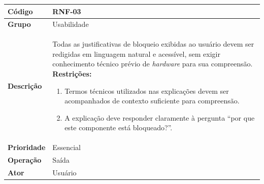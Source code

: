 \FloatBarrier
\begin{quadro}[htb]
  \caption{RNF-03 -- Linguagem natural nas explicações de incompatibilidade}
  \label{quad:rnf03}
  \begin{tabular}{|p{3.2cm}|p{11.8cm}|}
    \hline
    \textbf{Código}     & RNF-03                                                                                      \\ \hline
    \textbf{Grupo}      & Usabilidade                                                                                 \\ \hline
    \textbf{Descrição}  &
    Todas as justificativas de bloqueio exibidas ao usuário devem ser redigidas em linguagem natural e acessível, sem exigir conhecimento técnico prévio de \textit{hardware} para sua compreensão.
    \textbf{Restrições:}
    \begin{enumerate}[nosep,leftmargin=1.2em,topsep=2pt,partopsep=0pt,parsep=0pt,itemsep=1pt]
      \item Termos técnicos utilizados nas explicações devem ser acompanhados de contexto suficiente para compreensão.
      \item A explicação deve responder claramente à pergunta ``por que este componente está bloqueado?''.
    \end{enumerate} \\ \hline
    \textbf{Prioridade} & Essencial                                                                                   \\ \hline
    \textbf{Operação}   & Saída                                                                                       \\ \hline
    \textbf{Ator}       & Usuário                                                                                     \\ \hline
  \end{tabular}
\end{quadro}

